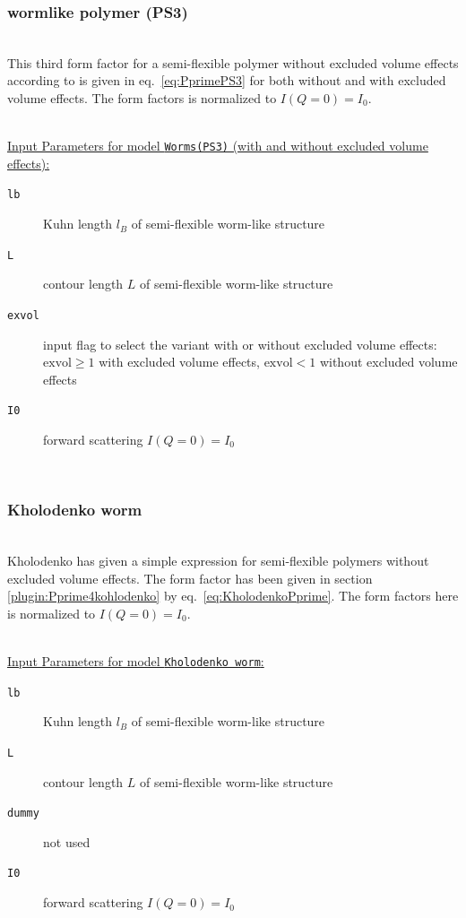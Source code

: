 \subsubsection{wormlike polymer (PS3)}
\label{sect:ffWorm(PS3)}
~\\
This third form factor for a semi-flexible polymer without excluded volume effects according to \cite{Pedersen96Macrom} is given in eq.\ \ref{eq:PprimePS3} for both without and with excluded volume effects. The form factors is normalized to $I(Q=0)=I_0$.

\vspace{5mm}

\hspace{1pt}\\
\uline{Input Parameters for model \texttt{Worms(PS3)} (with and without excluded volume effects):}\\
\begin{description}
\item[\texttt{lb}] Kuhn length $l_B$ of semi-flexible worm-like structure
\item[\texttt{L}] contour length $L$ of semi-flexible worm-like structure
\item[\texttt{exvol}] input flag to select the variant with or without excluded volume effects: $\mathrm{exvol} \geq 1$ with excluded volume effects, $\mathrm{exvol} < 1$ without excluded volume effects
\item[\texttt{I0}] forward scattering $I(Q=0)=I_0$
\end{description}

\vphantom{.}~\\

\subsubsection{Kholodenko worm}
\label{sect:ffKholodenkoWorm}
~\\
Kholodenko \cite{kholodenko93} has given a simple expression for semi-flexible polymers without excluded volume effects. The form factor has been given in section \ref{plugin:Pprime4kohlodenko} by eq.\ \ref{eq:KholodenkoPprime}. The form factors here is normalized to $I(Q=0)=I_0$.

\vspace{5mm}

\hspace{1pt}\\
\uline{Input Parameters for model \texttt{Kholodenko worm}:}\\
\begin{description}
\item[\texttt{lb}] Kuhn length $l_B$ of semi-flexible worm-like structure
\item[\texttt{L}] contour length $L$ of semi-flexible worm-like structure
\item[\texttt{dummy}] not used
\item[\texttt{I0}] forward scattering $I(Q=0)=I_0$
\end{description}

